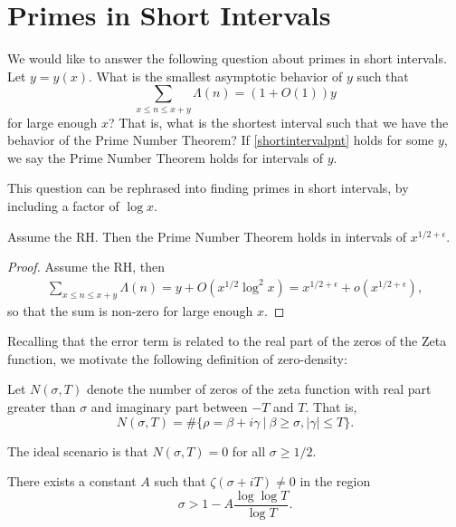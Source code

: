 \section{Primes in Short Intervals}
We would like to answer the following question about primes in short intervals. Let $y=y(x)$. What is the smallest asymptotic behavior of $y$
such that \begin{equation}\label{shortintervalpnt}
\sum_{x\leq n \leq x+y} \Lambda(n) = (1+O(1)) y
\end{equation}
for large enough $x$? That is, what is the shortest interval such that we have the behavior of the Prime Number Theorem? If \ref{shortintervalpnt} holds for some $y$,
we say the Prime Number Theorem holds for intervals of $y$.
\begin{remark}
    This question can be rephrased into finding primes in short intervals, by including a factor of $\log x$. 
\end{remark} 
\begin{proposition}
    Assume the RH. Then the Prime Number Theorem holds in intervals of $x^{1/2+\epsilon}$.
\end{proposition}
\begin{proof}
    Assume the RH, then
    \begin{align*}
        \sum_{x\leq n \leq x+y} \Lambda(n)=
        y+O(x^{1/2}\log^2 x) = x^{1/2+\epsilon} + o(x^{1/2+\epsilon}),
    \end{align*}
    so that the sum is non-zero for large enough $x$.
\end{proof}
Recalling that the error term is related to the real part of the zeros of the Zeta function, we motivate the following definition of zero-density:
\begin{definition}
    Let $N(\sigma, T)$ denote the number of zeros of the zeta function with real part greater than $\sigma$ and imaginary part between $-T$ and $T$. That is,\[
        N(\sigma,T) = \# \{\rho = \beta + i\gamma \ | \ \beta \geq\sigma, |\gamma|\leq T\}.
    \]
\end{definition}
\begin{remark}
    The ideal scenario is that $N(\sigma,T)=0$ for all $\sigma\geq 1/2$. 
\end{remark}
\begin{theorem}[Chudakov] 
    There exists a constant $A$ such that $\zeta(\sigma+iT)\neq 0$ in the region \begin{equation*}
        \sigma > 1 - A\frac{\log \log T}{\log T}.
    \end{equation*}
\end{theorem}
